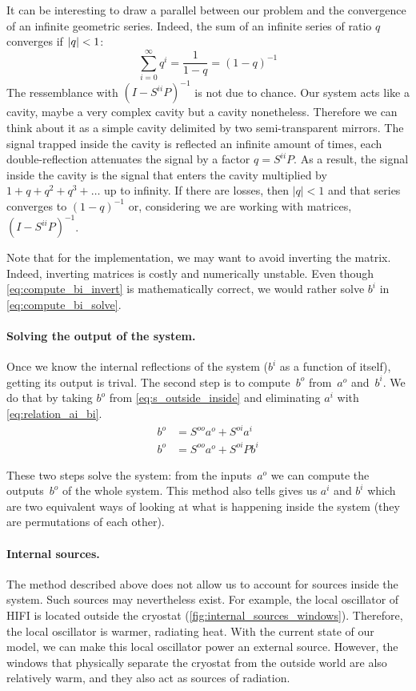 It can be interesting to draw a parallel between our problem and the convergence of an infinite geometric series.
Indeed, the sum of an infinite series of ratio $q$ converges if $\left| q \right| < 1$:
\begin{equation}
    \sum_{i=0}^\infty q^i = \frac{1}{1-q} = (1-q)^{-1}
\end{equation}
The ressemblance with $(I - S^{ii}P)^{-1}$ is not due to chance.
Our system acts like a cavity, maybe a very complex cavity but a cavity nonetheless.
Therefore we can think about it as a simple cavity delimited by two semi-transparent mirrors.
The signal trapped inside the cavity is reflected an infinite amount of times, each double-reflection attenuates the signal by a factor $q=S^{ii}P$.
As a result, the signal inside the cavity is the signal that enters the cavity multiplied by $1+q+q^2+q^3+\dots$ up to infinity.
If there are losses, then $|q|<1$ and that series converges to $(1-q)^{-1}$ or, considering we are working with matrices, $(I - S^{ii}P)^{-1}$.

Note that for the implementation, we may want to avoid inverting the matrix.
Indeed, inverting matrices is costly and numerically unstable.
Even though \cref{eq:compute_bi_invert} is mathematically correct, we would rather solve $b^i$ in \cref{eq:compute_bi_solve}.

\paragraph{Solving the output of the system.}
Once we know the internal reflections of the system ($b^i$ as a function of itself), getting its output is trival.
The second step is to compute~$b^o$ from~$a^o$ and~$b^i$.
We do that by taking $b^o$ from \cref{eq:s_outside_inside} and eliminating $a^i$ with \cref{eq:relation_ai_bi}.
\begin{align}
    b^o &= S^{oo}a^o + S^{oi}a^i \\
    b^o &= S^{oo}a^o + S^{oi}Pb^i \label{eq:compute_bo}
\end{align}

These two steps solve the system: from the inputs~$a^o$ we can compute the outputs~$b^o$ of the whole system.
This method also tells gives us $a^i$ and $b^i$ which are two equivalent ways of looking at what is happening inside the system (they are permutations of each other).



\paragraph{Internal sources.}
The method described above does not allow us to account for sources inside the system.
Such sources may nevertheless exist.
For example, the local oscillator of HIFI is located outside the cryostat (\cref{fig:internal_sources_windows}).
Therefore, the local oscillator is warmer, radiating heat.
With the current state of our model, we can make this local oscillator power an external source.
However, the windows that physically separate the cryostat from the outside world are also relatively warm, and they also act as sources of radiation.

